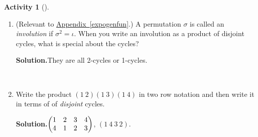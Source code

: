 \documentclass[10pt,]{book}
\theoremstyle{plain}
\theoremstyle{definition}
\newtheorem{activity}[project]{Activity}
\numberwithin{equation}{chapter}
\newcommand{\amp}{&}
\begin{document}
\begin{activity}[]\label{activity-258}
~\par
\begin{enumerate}[label=(\alph*)]
 \item (Relevant to \hyperref[expogenfun]{Appendix~\ref{expogenfun}}.) A permutation \(\sigma\) is called an \emph{involution} if \(\sigma^2=\iota\). When you write an involution as a product of disjoint cycles, what is special about the cycles?%
\par\medskip\noindent%
\textbf{Solution.}\quad They are all 2-cycles or 1-cycles.%

~\par
\item Write the product \((1\ 2)(1\ 3)(1\ 4)\) in two row notation and then write it in terms of of \emph{disjoint} cycles.%
\par\medskip\noindent%
\textbf{Solution.}\quad \(\begin{pmatrix}1\amp 2\amp 3\amp 4\cr4\amp 1\amp 2\amp 3
\end{pmatrix}\), \((1\ 4\ 3\ 2)\).%

\end{enumerate}
\end{activity}
\typeout{************************************************}
\typeout{************************************************}
\end{document}
